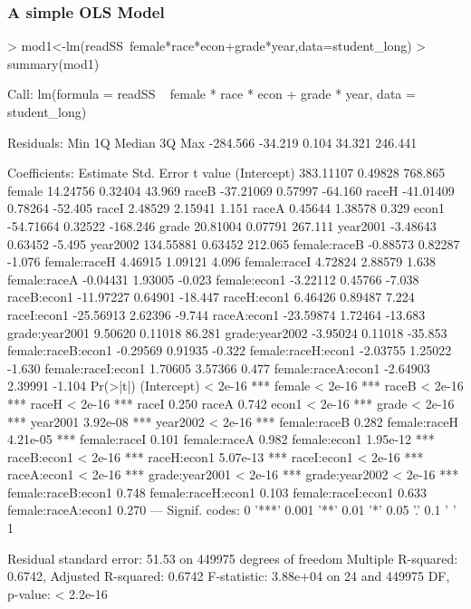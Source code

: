 \documentclass[12pt,handout]{beamer}
\begin{document}
\begin{frame}
\frametitle{A simple OLS Model}
\begin{Schunk}
\begin{Sinput}
> mod1<-lm(readSS~female*race*econ+grade*year,data=student_long)
> summary(mod1)
\end{Sinput}
\begin{Soutput}
Call:
lm(formula = readSS ~ female * race * econ + grade * year, data = student_long)

Residuals:
     Min       1Q   Median       3Q      Max 
-284.566  -34.219    0.104   34.321  246.441 

Coefficients:
                    Estimate Std. Error  t value
(Intercept)        383.11107    0.49828  768.865
female              14.24756    0.32404   43.969
raceB              -37.21069    0.57997  -64.160
raceH              -41.01409    0.78264  -52.405
raceI                2.48529    2.15941    1.151
raceA                0.45644    1.38578    0.329
econ1              -54.71664    0.32522 -168.246
grade               20.81004    0.07791  267.111
year2001            -3.48643    0.63452   -5.495
year2002           134.55881    0.63452  212.065
female:raceB        -0.88573    0.82287   -1.076
female:raceH         4.46915    1.09121    4.096
female:raceI         4.72824    2.88579    1.638
female:raceA        -0.04431    1.93005   -0.023
female:econ1        -3.22112    0.45766   -7.038
raceB:econ1        -11.97227    0.64901  -18.447
raceH:econ1          6.46426    0.89487    7.224
raceI:econ1        -25.56913    2.62396   -9.744
raceA:econ1        -23.59874    1.72464  -13.683
grade:year2001       9.50620    0.11018   86.281
grade:year2002      -3.95024    0.11018  -35.853
female:raceB:econ1  -0.29569    0.91935   -0.322
female:raceH:econ1  -2.03755    1.25022   -1.630
female:raceI:econ1   1.70605    3.57366    0.477
female:raceA:econ1  -2.64903    2.39991   -1.104
                   Pr(>|t|)    
(Intercept)         < 2e-16 ***
female              < 2e-16 ***
raceB               < 2e-16 ***
raceH               < 2e-16 ***
raceI                 0.250    
raceA                 0.742    
econ1               < 2e-16 ***
grade               < 2e-16 ***
year2001           3.92e-08 ***
year2002            < 2e-16 ***
female:raceB          0.282    
female:raceH       4.21e-05 ***
female:raceI          0.101    
female:raceA          0.982    
female:econ1       1.95e-12 ***
raceB:econ1         < 2e-16 ***
raceH:econ1        5.07e-13 ***
raceI:econ1         < 2e-16 ***
raceA:econ1         < 2e-16 ***
grade:year2001      < 2e-16 ***
grade:year2002      < 2e-16 ***
female:raceB:econ1    0.748    
female:raceH:econ1    0.103    
female:raceI:econ1    0.633    
female:raceA:econ1    0.270    
---
Signif. codes:  0 '***' 0.001 '**' 0.01 '*' 0.05 '.' 0.1 ' ' 1 

Residual standard error: 51.53 on 449975 degrees of freedom
Multiple R-squared: 0.6742,  Adjusted R-squared: 0.6742 
F-statistic: 3.88e+04 on 24 and 449975 DF,  p-value: < 2.2e-16 
\end{Soutput}
\end{Schunk}
\end{frame}
\end{document}
